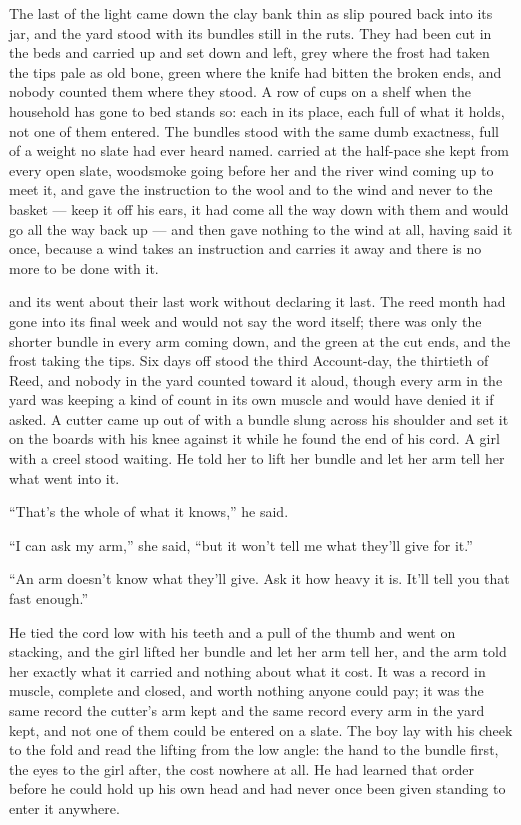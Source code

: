 The last of the light came down the clay bank thin as slip poured back into its jar, and the yard stood with its bundles still in the ruts. They had been cut in the beds and carried up and set down and left, grey where the frost had taken the tips pale as old bone, green where the knife had bitten the broken ends, and nobody counted them where they stood. A row of cups on a shelf when the household has gone to bed stands so: each in its place, each full of what it holds, not one of them entered. The bundles stood with the same dumb exactness, full of a weight no slate had ever heard named.  carried  at the half-pace she kept from every open slate, woodsmoke going before her and the river wind coming up to meet it, and gave the instruction to the wool and to the wind and never to the basket --- keep it off his ears, it had come all the way down with them and would go all the way back up --- and then gave nothing to the wind at all, having said it once, because a wind takes an instruction and carries it away and there is no more to be done with it.

 and its  went about their last work without declaring it last. The reed month had gone into its final week and would not say the word itself; there was only the shorter bundle in every arm coming down, and the green at the cut ends, and the frost taking the tips. Six days off stood the third Account-day, the thirtieth of Reed, and nobody in the yard counted toward it aloud, though every arm in the yard was keeping a kind of count in its own muscle and would have denied it if asked. A cutter came up out of  with a bundle slung across his shoulder and set it on the boards with his knee against it while he found the end of his cord. A girl with a creel stood waiting. He told her to lift her bundle and let her arm tell her what went into it.

“That's the whole of what it knows,” he said.

“I can ask my arm,” she said, “but it won't tell me what they'll give for it.”

“An arm doesn't know what they'll give. Ask it how heavy it is. It'll tell you that fast enough.”

He tied the cord low with his teeth and a pull of the thumb and went on stacking, and the girl lifted her bundle and let her arm tell her, and the arm told her exactly what it carried and nothing about what it cost. It was a record in muscle, complete and closed, and worth nothing anyone could pay; it was the same record the cutter's arm kept and the same record every arm in the yard kept, and not one of them could be entered on a slate. The boy lay with his cheek to the fold and read the lifting from the low angle: the hand to the bundle first, the eyes to the girl after, the cost nowhere at all. He had learned that order before he could hold up his own head and had never once been given standing to enter it anywhere.

